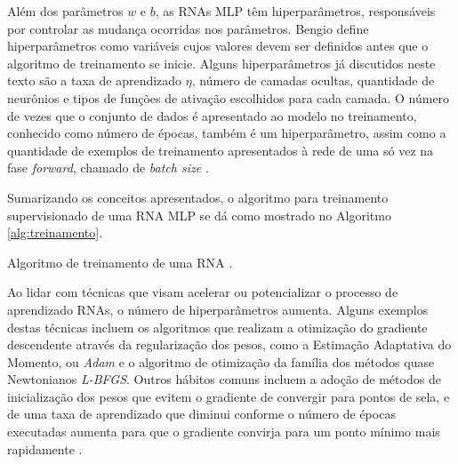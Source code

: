 Além dos parâmetros $w$ e $b$, as RNAs MLP têm hiperparâmetros, responsáveis por controlar as mudança ocorridas nos parâmetros. Bengio define hiperparâmetros como variáveis cujos valores devem ser definidos antes que o algoritmo de treinamento se inicie. Alguns hiperparâmetros já discutidos neste texto são a taxa de aprendizado $\eta$, número de camadas ocultas, quantidade de neurônios e tipos de funções de ativação escolhidos para cada camada. O número de vezes que o conjunto de dados é apresentado ao modelo no treinamento, conhecido como número de épocas, também é um hiperparâmetro, assim como a quantidade de exemplos de treinamento apresentados à rede de uma só vez na fase \emph{forward}, chamado de \emph{batch size} \cite{bengio2012practical}.

Sumarizando os conceitos apresentados, o algoritmo para treinamento supervisionado de uma RNA MLP se dá como mostrado no Algoritmo \ref{alg:treinamento}.

\begin{algorithm}[h!]
	\caption{Algoritmo de treinamento de uma RNA  \cite{Teresa:Livro}.}\label{alg:treinamento}
\end{algorithm}

Ao lidar com técnicas que visam acelerar ou potencializar o processo de aprendizado RNAs, o número de hiperparâmetros aumenta. Alguns exemplos destas técnicas incluem os algoritmos que realizam a otimização do gradiente descendente através da regularização dos pesos, como a Estimação Adaptativa do Momento, ou \emph{Adam} e o algoritmo de otimização da família dos métodos quase Newtonianos \emph{L-BFGS}. Outros hábitos comuns incluem a adoção de métodos de inicialização dos pesos que evitem o gradiente de convergir para pontos de sela, e de uma taxa de aprendizado que diminui conforme o número de épocas executadas aumenta para que o gradiente convirja para um ponto mínimo mais rapidamente \cite{goodfellow2016deep}.


